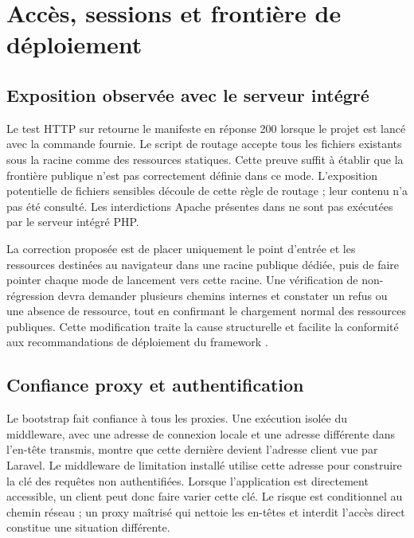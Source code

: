\section{Accès, sessions et frontière de déploiement}

\subsection{Exposition observée avec le serveur intégré}

Le test HTTP sur  retourne le manifeste en réponse 200 lorsque le projet est lancé avec la commande fournie. Le script de routage accepte tous les fichiers existants sous la racine comme des ressources statiques. Cette preuve suffit à établir que la frontière publique n'est pas correctement définie dans ce mode. L'exposition potentielle de fichiers sensibles découle de cette règle de routage ; leur contenu n'a pas été consulté. Les interdictions Apache présentes dans  ne sont pas exécutées par le serveur intégré PHP.

La correction proposée est de placer uniquement le point d'entrée et les ressources destinées au navigateur dans une racine publique dédiée, puis de faire pointer chaque mode de lancement vers cette racine. Une vérification de non-régression devra demander plusieurs chemins internes et constater un refus ou une absence de ressource, tout en confirmant le chargement normal des ressources publiques. Cette modification traite la cause structurelle et facilite la conformité aux recommandations de déploiement du framework \cite{laravel-deployment,php-server}.

\subsection{Confiance proxy et authentification}

Le bootstrap fait confiance à tous les proxies. Une exécution isolée du middleware, avec une adresse de connexion locale et une adresse différente dans l'en-tête transmis, montre que cette dernière devient l'adresse client vue par Laravel. Le middleware de limitation installé utilise cette adresse pour construire la clé des requêtes non authentifiées. Lorsque l'application est directement accessible, un client peut donc faire varier cette clé. Le risque est conditionnel au chemin réseau ; un proxy maîtrisé qui nettoie les en-têtes et interdit l'accès direct constitue une situation différente.

